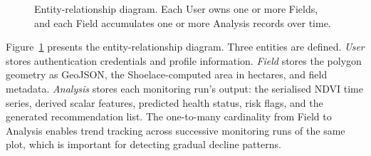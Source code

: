 \documentclass[conference]{IEEEtran}
\begin{document}
\begin{figure}[!t]
\centering
{}
\caption{Entity-relationship diagram. Each User owns one or more Fields,
and each Field accumulates one or more Analysis records over time.}
\label{fig:er}
\end{figure}

Figure~\ref{fig:er} presents the entity-relationship diagram. Three
entities are defined. \textit{User} stores authentication credentials and
profile information. \textit{Field} stores the polygon geometry as GeoJSON,
the Shoelace-computed area in hectares, and field metadata. \textit{Analysis}
stores each monitoring run's output: the serialised NDVI time series,
derived scalar features, predicted health status, risk flags, and the
generated recommendation list. The one-to-many cardinality from Field to
Analysis enables trend tracking across successive monitoring runs of the
same plot, which is important for detecting gradual decline patterns.
\end{document}
